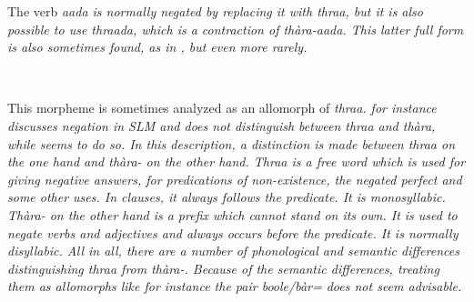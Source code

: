 



The verb \em aada \em is normally negated by replacing it with \em thraa\em{}, but it is also possible to use \em thraada\em{}, which is a contraction of \em thàra-aada\em. This latter full form is also sometimes found, as in , but even more rarely.

\\ 


This morpheme is sometimes analyzed as an allomorph of \em thraa\em. 
\citet{Slomanson2007cll} for instance discusses negation in SLM and does not distinguish between \em thraa \em and \em thàra\em, while \citet{Adelaar1991} seems to do so. In this description, a distinction is made between \em thraa \em on the one hand and \em thàra- \em on the other hand. \em Thraa \em is a free word which is used for giving negative answers, for predications of non-existence, the negated perfect and some other uses. In clauses, it always follows the predicate. It is monosyllabic. \em Thàra- \em on the other hand is a prefix which cannot stand on its own. It is used to negate verbs and adjectives and always occurs before the predicate. It is normally disyllabic. All in all, there are a number of phonological and semantic differences distinguishing \em thraa \em from \em thàra-\em. Because of the semantic differences, treating them as allomorphs like for instance the pair \em boole/bàr= \em does not seem advisable.

